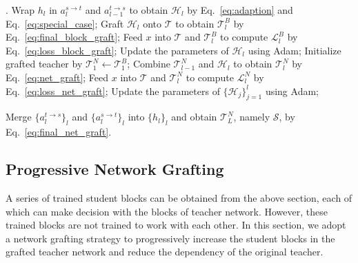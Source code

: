 \documentclass[letterpaper]{article} %
\begin{document}
{{        
    }

    {
        \setlength{\textfloatsep}{2pt}
        \renewcommand{\algorithmicrequire}{\textbf{Input:}} 
        \renewcommand{\algorithmicensure}{\textbf{Output:}}
        \begin{algorithm}[!t]
            \caption{Network Grafting for Few-Shot Knowledge Distillation}
            \label{alg:A1}
            \begin{algorithmic}[1]
                .
                    \State Wrap $h_l$ in $a_l^{s \rightarrow t}$ and $a_{l-1}^{t \rightarrow s}$ to obtain $\mathcal{H}_l$ by Eq.~\ref{eq:adaption} and Eq.~\ref{eq:special_case};
                    \State Graft $\mathcal{H}_l$ onto $\mathcal{T}$ to obtain $\mathcal{T}_l^B$ by Eq.~\ref{eq:final_block_graft};
                        \State Feed $x$ into $\mathcal{T}$ and $\mathcal{T}_l^B$ to compute $\mathcal{L}_l^{B}$ by Eq.~\ref{eq:loss_block_graft};
                        \State Update the parameters of $\mathcal{H}_l$ using Adam;
                    \EndFor
                \EndFor
                \State Initialize grafted teacher by $\mathcal{T}_{1}^N \leftarrow \mathcal{T}_{1}^B$;
                    \State Combine $\mathcal{T}_{l-1}^N$ and $\mathcal{H}_l$ to obtain $\mathcal{T}_l^N$ by Eq.~\ref{eq:net_graft};
                        \State Feed $x$ into $\mathcal{T}$ and $\mathcal{T}_l^N$ to compute $\mathcal{L}_l^{N}$ by Eq.~\ref{eq:loss_net_graft};
                        \State Update the parameters of $\{ \mathcal{H}_j \}_{j=1}^l$ using Adam;
                    \EndFor
                \EndFor

                \State Merge $\{a_l^{t \rightarrow s}\}_l$ and $\{a_l^{s \rightarrow t}\}_l$ into $\{h_l\}_l$ and obtain $\mathcal{T}_L^{N}$, namely $\mathcal{S}$, by Eq.~\ref{eq:final_net_graft}.
            \end{algorithmic}
        \end{algorithm}
    }

    \subsection{Progressive Network Grafting}
    {
        A series of trained student blocks can be obtained from the above section, each of which can make decision with the blocks of teacher network.
        However, these trained blocks are not trained to work with each other.
        In this section, we adopt a network grafting strategy to progressively increase the student blocks in the grafted teacher network and reduce the dependency of the original teacher. 

}}
\end{document}
